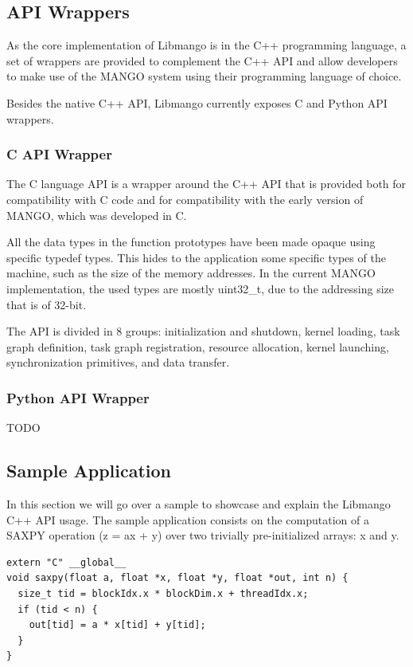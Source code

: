 \subsection{API Wrappers}
As the core implementation of Libmango is in the C++ programming language, a set of wrappers are provided to complement the C++ API and allow developers to make use of the MANGO system using their programming language of choice.

Besides the native C++ API, Libmango currently exposes C and Python API wrappers.

\subsubsection{C API Wrapper}
The C language API is a wrapper around the C++ API that is provided both for compatibility with C code and for compatibility with the early version of MANGO, which was developed in C.

All the data types in the function prototypes have been made opaque using specific typedef types. This hides to the application some specific types of the machine, such as the size of the memory addresses. In the current MANGO implementation, the used types are mostly uint32\_t, due to the addressing size that is of 32-bit.

The API is divided in 8 groups: initialization and shutdown, kernel loading, task graph definition, task graph registration, resource allocation, kernel launching, synchronization primitives, and data transfer. \cite{mango_exploring_manycore_architectures}

\subsubsection{Python API Wrapper}
TODO

\subsection{Sample Application}

In this section we will go over a sample to showcase and explain the Libmango C++ API usage. The sample application consists on the computation of a SAXPY operation (z = ax + y) over two trivially pre-initialized arrays: x and y. 

\begin{lstlisting}[style=CStyle, caption=saxpy.cu]
extern "C" __global__ 
void saxpy(float a, float *x, float *y, float *out, int n) {
  size_t tid = blockIdx.x * blockDim.x + threadIdx.x;
  if (tid < n) {
    out[tid] = a * x[tid] + y[tid];
  }
}
\end{lstlisting}

